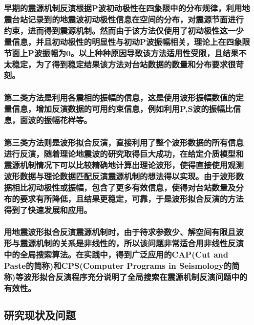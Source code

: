 \documentclass[a4paper,12pt,single,pdftex]{scrartcl}
\begin{document}
\label{ID_1137644143}\subsubsection{早期的震源机制反演根据P波初动极性在四象限中的分布规律\citep{Balakina1961}，利用地震台站记录到的地震波初动极性信息在空间的分布，对震源节面进行约束，进而得到震源机制。然而由于该方法仅使用了初动极性这一少量信息，并且初动极性的明显性与初动P波振幅相关，理论上在四象限节面上P波振幅为0\citep{Stein2003}。以上种种原因导致该方法适用性受限，且结果不太稳定，为了得到稳定结果该方法对台站数据的数量和分布要求很苛刻。}

\label{ID_1788012684}\subsubsection{第二类方法是利用各震相的振幅的信息，这是使用波形振幅数值的定量信息，增加反演数据的可用约束信息，例如利用P,S波的振幅比信息\citep{Kisslinger1982,Kisslinger1980}，面波的振幅花样\citep{Stein2003}等。}

\label{ID_1741964446}\subsubsection{第三类方法则是波形拟合反演，直接利用了整个波形数据的所有信息进行反演，随着理论地震波的研究取得巨大成功\citep{Haskell1964,Herrmann1979,Wang1980}，在给定介质模型和震源机制情况下可以比较精确地计算出理论波形，使得直接使用观测波形数据与理论数据匹配反演震源机制的想法得以实现。由于波形数据相比初动极性或振幅，包含了更多有效信息，使得对台站数量及分布的要求有所降低，且结果更稳定，可靠，于是波形拟合反演的方法得到了快速发展和应用\citep{Walter1993,Ritsema1993,Zhao1994,Nabvelek1995}。}

\label{ID_1436540560}\subsubsection{用地震波形拟合反演震源机制时，由于待求参数少、解空间有限且波形与震源机制的关系是非线性的，所以该问题非常适合用非线性反演中的全局搜索算法。在实践中，得到广泛应用的CAP(Cut and Paste的简称)\citep{Zhao1994,Zhu1996,Tan2006}和CPS(Computer Programs in Seismology的简称)\citep{Herrmann1989}等波形拟合反演程序充分说明了全局搜索在震源机制反演问题中的有效性。}

\label{ID_1102145719}\subsection{研究现状及问题}
\end{document}
